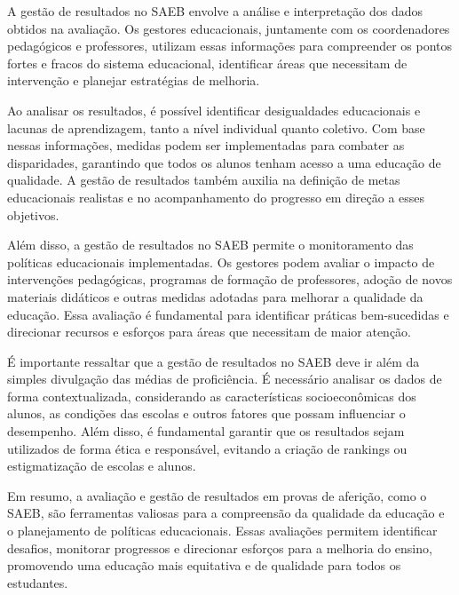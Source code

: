 A gestão de resultados no SAEB envolve a análise e interpretação dos
dados obtidos na avaliação. Os gestores educacionais, juntamente com os
coordenadores pedagógicos e professores, utilizam essas informações para
compreender os pontos fortes e fracos do sistema educacional,
identificar áreas que necessitam de intervenção e planejar estratégias
de melhoria.

Ao analisar os resultados, é possível identificar desigualdades
educacionais e lacunas de aprendizagem, tanto a nível individual quanto
coletivo. Com base nessas informações, medidas podem ser implementadas
para combater as disparidades, garantindo que todos os alunos tenham
acesso a uma educação de qualidade. A gestão de resultados também
auxilia na definição de metas educacionais realistas e no acompanhamento
do progresso em direção a esses objetivos.

Além disso, a gestão de resultados no SAEB permite o monitoramento das
políticas educacionais implementadas. Os gestores podem avaliar o
impacto de intervenções pedagógicas, programas de formação de
professores, adoção de novos materiais didáticos e outras medidas
adotadas para melhorar a qualidade da educação. Essa avaliação é
fundamental para identificar práticas bem-sucedidas e direcionar
recursos e esforços para áreas que necessitam de maior atenção.

É importante ressaltar que a gestão de resultados no SAEB deve ir além
da simples divulgação das médias de proficiência. É necessário analisar
os dados de forma contextualizada, considerando as características
socioeconômicas dos alunos, as condições das escolas e outros fatores
que possam influenciar o desempenho. Além disso, é fundamental garantir
que os resultados sejam utilizados de forma ética e responsável,
evitando a criação de rankings ou estigmatização de escolas e alunos.

Em resumo, a avaliação e gestão de resultados em provas de aferição,
como o SAEB, são ferramentas valiosas para a compreensão da qualidade da
educação e o planejamento de políticas educacionais. Essas avaliações
permitem identificar desafios, monitorar progressos e direcionar
esforços para a melhoria do ensino, promovendo uma educação mais
equitativa e de qualidade para todos os estudantes.

